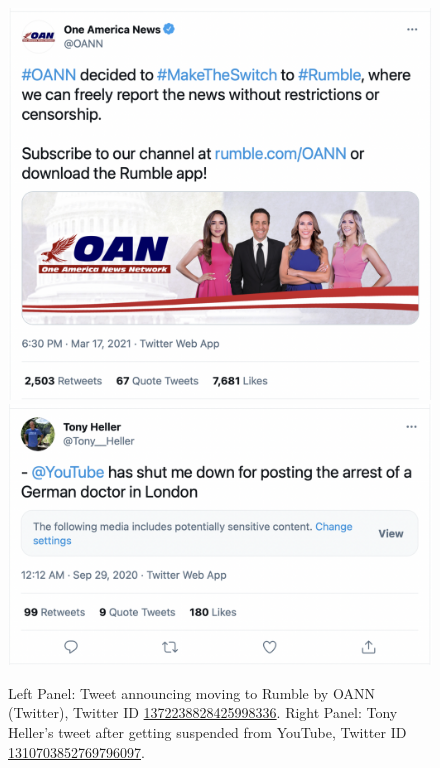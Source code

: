 \documentclass{article}
\begin{document}
\begin{figure}[h]
	\centering
	
		\includegraphics[scale=0.21]{./img/oann/fig3_oann.png}
		\includegraphics[scale=0.31]{./img/tony/fig3_tony.png}
	\caption{Left Panel: Tweet announcing moving to Rumble by OANN (Twitter), Twitter ID \href{https://twitter.com/OANN/status/1372238828425998336}{1372238828425998336}. Right Panel: Tony Heller's tweet after getting suspended from YouTube, Twitter ID \href{https://twitter.com/Tony\_Heller/status/1310703852769796097}{1310703852769796097}.}
	\label{fig2_oann}
\end{figure}
\end{document}

